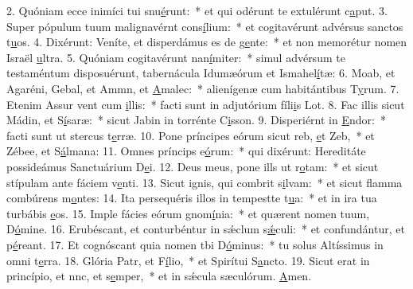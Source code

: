 2. Quóniam ecce inimíci tui snu\uline{é}runt:~* et qui odérunt te extulérunt c\uline{a}put.
3. Super pópulum tuum malignavérnt cons\uline{í}lium:~* et cogitavérunt advérsus sanctos t\uline{u}os.
4. Dixérunt: Veníte, et disperdámus es de g\uline{e}nte:~* et non memorétur nomen Israël \uline{u}ltra.
5. Quóniam cogitavérunt nan\uline{í}miter:~* simul advérsum te testaméntum disposuérunt, tabernácula Idumæórum et Ismahel\uline{í}tæ:
6. Moab, et Agaréni, Gebal, et Ammn, et \uline{A}malec:~* alienígenæ cum habitántibus T\uline{y}rum.
7. Etenim Assur vent cum \uline{i}llis:~* facti sunt in adjutórium fíli\uline{i}s Lot.
8. Fac illis sicut Mádin, et S\uline{í}saræ:~* sicut Jabin in torrénte C\uline{i}sson.
9. Disperiérnt in \uline{E}ndor:~* facti sunt ut stercus t\uline{e}rræ.
10. Pone príncipes eórum sicut reb, \uline{e}t Zeb,~* et Zébee, et S\uline{á}lmana:
11. Omnes príncips e\uline{ó}rum:~* qui dixérunt: Hereditáte possideámus Sanctuárium D\uline{e}i.
12. Deus meus, pone ills ut r\uline{o}tam:~* et sicut stípulam ante fáciem v\uline{e}nti.
13. Sicut ignis, qui combrit s\uline{i}lvam:~* et sicut flamma combúrens m\uline{o}ntes:
14. Ita persequéris illos in tempestte t\uline{u}a:~* et in ira tua turbábis \uline{e}os.
15. Imple fácies eórum gnom\uline{í}nia:~* et quærent nomen tuum, D\uline{ó}mine.
16. Erubéscant, et conturbéntur in sǽclum s\uline{ǽ}culi:~* et confundántur, et p\uline{é}reant.
17. Et cognóscant quia nomen tbi D\uline{ó}minus:~* tu solus Altíssimus in omni t\uline{e}rra.
18. Glória Patr, et F\uline{í}lio,~* et Spirítui S\uline{a}ncto.
19. Sicut erat in princípio, et nnc, et s\uline{e}mper,~* et in sǽcula sæculórum. \uline{A}men.
